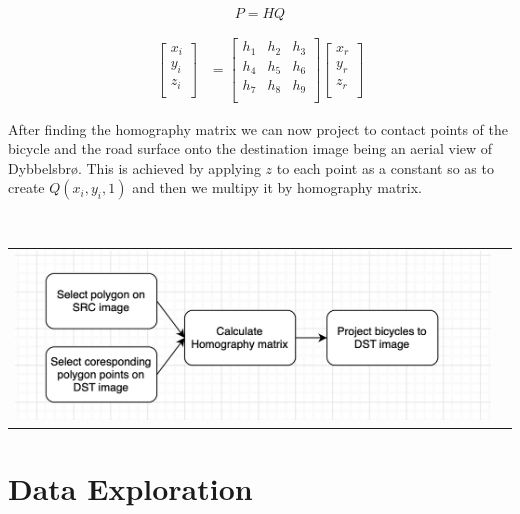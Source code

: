 \documentclass[
10pt, %
a4paper, %
oneside, %
headinclude,footinclude, %
] {book}%
\begin{document}
\begin{equation}
  P = HQ\label{eq:2}
\end{equation} 

\begin{align}
\label{eq:3}
  \begin{bmatrix}
    x_{i} \\
    y_{i} \\
    z_{i} \\
  \end{bmatrix}
  &= \begin{bmatrix}
      h_1 & h_2 & h_3 \\
      h_4 & h_5 & h_6 \\
      h_7 & h_8 & h_9 \\
  \end{bmatrix}
  \begin{bmatrix}
    x_{r} \\
    y_{r} \\
    z_{r} \\
  \end{bmatrix}
\end{align}

After finding the homography matrix we can now project to contact points of the bicycle and the road surface onto the destination
image being an aerial view of Dybbelsbrø. This is achieved by applying $z$ to each point as a constant so as to create $Q(x_i, y_i, 1)$ and then we multipy it by 
homography matrix.

\ \\ 
\noindent
\begin{tabular}{@{}cc}
\includegraphics[width=1.0\columnwidth]{homo_flow.png} 
\end{tabular}
\label{homography}

\section{Data Exploration}
\end{document}

